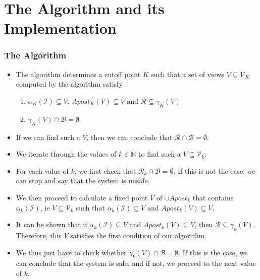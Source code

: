 \documentclass{beamer}
\begin{document}
    \section{The Algorithm and its Implementation}
    {
        \begin{frame}
            \frametitle{The Algorithm}
            \begin{itemize}
                \item The algorithm determines a cutoff point $K$ such that a set of views $V \subseteq \mathcal{V}_{K}$ computed by the algorithm satisfy
                \begin{enumerate}
                    \item $\alpha_{K}(\mathcal{I}) \subseteq V$, $Apost_{K}(V) \subseteq V$ and $\mathcal{R} \subseteq \gamma_{K}(V)$
                    \item $\gamma_{K}(V) \cap \mathcal{B} = \emptyset$
                \end{enumerate}
                \item If we can find such a $V$, then we can conclude that $\mathcal{R} \cap \mathcal{B} = \emptyset$.
                \item We iterate through the values of $k \in \mathbb{N}$ to find such a $V \subseteq \mathcal{V}_{k}$.
                \item For each value of $k$, we first check that $\mathcal{R}_{k} \cap \mathcal{B} = \emptyset$. If this is not the case, we can stop and say that the system is unsafe.
                \item We then proceed to calculate a fixed point $V$ of $\cup Apost_{k}$ that contains $\alpha_{k}(\mathcal{I})$, ie $V \subseteq \mathcal{V}_{k}$ such that $\alpha_{k}(\mathcal{I}) \subseteq V$ and $Apost_{k}(V) \subseteq V$.
                \item It can be shown that if $\alpha_{k}(\mathcal{I}) \subseteq V$ and $Apost_{k}(V) \subseteq V$, then $\mathcal{R} \subseteq \gamma_{k}(V)$. Therefore, this $V$ satisfies the first condition of our algorithm.
                \item We thus just have to check whether $\gamma_{k}(V) \cap \mathcal{B} = \emptyset$. If this is the case, we can conclude that the system is safe, and if not, we proceed to the next value of $k$.
            \end{itemize}
        \end{frame}

}
\end{document}
